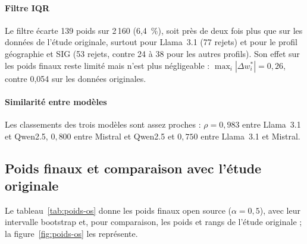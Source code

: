 \documentclass[11pt,a4paper]{article}
\begin{document}
\paragraph{Filtre IQR} Le filtre écarte 139 poids sur 2\,160 (6,4~\%), soit près de deux fois plus que sur les données de l'étude originale, surtout pour Llama~3.1 (77 rejets) et pour le profil géographie et SIG (53 rejets, contre 24 à 38 pour les autres profils). Son effet sur les poids finaux reste limité mais n'est plus négligeable : $\max_i|\Delta w^*_i|=0{,}26$, contre 0,054 sur les données originales.

\paragraph{Similarité entre modèles} Les classements des trois modèles sont assez proches : $\rho=0{,}983$ entre Llama~3.1 et Qwen2.5, $0{,}800$ entre Mistral et Qwen2.5 et $0{,}750$ entre Llama~3.1 et Mistral.

\subsection{Poids finaux et comparaison avec l'étude originale}

Le tableau~\ref{tab:poids-os} donne les poids finaux open source ($\alpha=0{,}5$), avec leur intervalle bootstrap et, pour comparaison, les poids et rangs de l'étude originale ; la figure~\ref{fig:poids-os} les représente.
\end{document}
